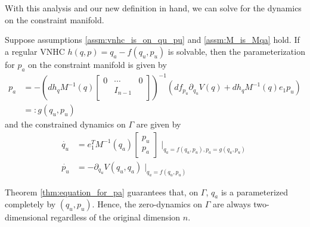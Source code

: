 With this analysis and our new definition in hand, we can solve for the dynamics on the constraint manifold.

\begin{thm}\label{thm:equation_for_pa}
Suppose assumptions \ref{assm:vnhc_is_on_qu_pu} and \ref{assm:M_is_Mqa} hold.
If a regular VNHC \(h(q,p) = q_a - f(q_u,p_u)\) is solvable, then the
parameterization for \(p_a\) on the constraint manifold is given by
\begin{align*}
p_a &= -\left(dh_q M^{-1}(q) \begin{bmatrix}
    0 & \cdots & 0 \\
    & I_{n-1} & \\
    \end{bmatrix}\right)^{-1}\left( df_{p_u}\partial_{q_u}V(q) + dh_q M^{-1}(q)e_1 p_u\right) \\
    &=: g(q_u,p_u)
\end{align*}
and the constrained dynamics on \(\Gamma\) are given by
\begin{align*}
    \dot{q_u} &= e_1^T M^{-1}(q_a) \begin{bmatrix}
    p_u \\
    p_a
    \end{bmatrix}\mid_{q_a = f(q_u,p_u), p_a = g(q_u,p_u)} \\
    \dot{p_u} &= -\partial_{q_u} V(q_u,q_a) \mid_{q_a = f(q_u,p_u)}
\end{align*}
\end{thm}

Theorem \ref{thm:equation_for_pa} guarantees that, on \(\Gamma\), \(q_a\) is a
parameterized completely by \((q_u,p_u)\). Hence, the zero-dynamics on
\(\Gamma\) are always two-dimensional regardless of the original dimension
\(n\).
